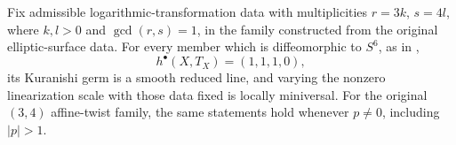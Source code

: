 \begin{proposition}\hypertarget{tag-01GI}{}\label{cdp:st:E11}

Fix admissible logarithmic-transformation data with multiplicities
$r=3k$, $s=4l$, where $k,l>0$ and $\gcd(r,s)=1$, in the family
constructed from the original elliptic-surface data. For every member
which is diffeomorphic to $S^6$, as in
\cite[Theorem~1.1, p.~1]{Viaclovsky2026Log},
\[
 h^\bullet(X,T_X)=(1,1,1,0),
\]
its Kuranishi germ is a smooth reduced line, and varying the nonzero
linearization scale with those data fixed is locally miniversal.
For the original $(3,4)$ affine-twist family, the same statements
hold whenever $p\ne0$, including $|p|>1$.
\end{proposition}


